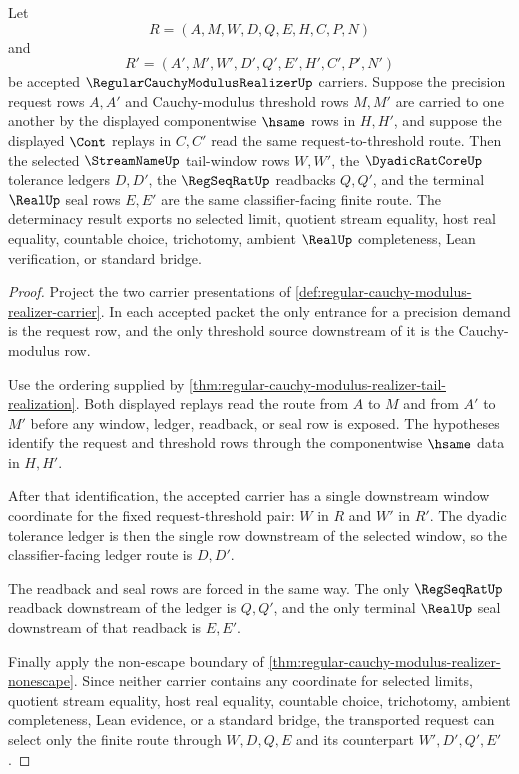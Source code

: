 \begin{theorem}
\label{thm:regular-cauchy-modulus-realizer-request-transport-determinacy}
Let
$$
R=(A,M,W,D,Q,E,H,C,P,N)
$$
and
$$
R'=(A',M',W',D',Q',E',H',C',P',N')
$$
be accepted $\RegularCauchyModulusRealizerUp$ carriers. Suppose the precision request rows $A,A'$ and Cauchy-modulus threshold rows $M,M'$ are carried to one another by the displayed componentwise $\hsame$ rows in $H,H'$, and suppose the displayed $\Cont$ replays in $C,C'$ read the same request-to-threshold route. Then the selected $\StreamNameUp$ tail-window rows $W,W'$, the $\DyadicRatCoreUp$ tolerance ledgers $D,D'$, the $\RegSeqRatUp$ readbacks $Q,Q'$, and the terminal $\RealUp$ seal rows $E,E'$ are the same classifier-facing finite route. The determinacy result exports no selected limit, quotient stream equality, host real equality, countable choice, trichotomy, ambient $\RealUp$ completeness, Lean verification, or standard bridge.
\end{theorem}
\begin{proof}
Project the two carrier presentations of \autoref{def:regular-cauchy-modulus-realizer-carrier}. In each accepted packet the only entrance for a precision demand is the request row, and the only threshold source downstream of it is the Cauchy-modulus row.

Use the ordering supplied by \autoref{thm:regular-cauchy-modulus-realizer-tail-realization}. Both displayed replays read the route from $A$ to $M$ and from $A'$ to $M'$ before any window, ledger, readback, or seal row is exposed. The hypotheses identify the request and threshold rows through the componentwise $\hsame$ data in $H,H'$.

After that identification, the accepted carrier has a single downstream window coordinate for the fixed request-threshold pair: $W$ in $R$ and $W'$ in $R'$. The dyadic tolerance ledger is then the single row downstream of the selected window, so the classifier-facing ledger route is $D,D'$.

The readback and seal rows are forced in the same way. The only $\RegSeqRatUp$ readback downstream of the ledger is $Q,Q'$, and the only terminal $\RealUp$ seal downstream of that readback is $E,E'$.

Finally apply the non-escape boundary of \autoref{thm:regular-cauchy-modulus-realizer-nonescape}. Since neither carrier contains any coordinate for selected limits, quotient stream equality, host real equality, countable choice, trichotomy, ambient completeness, Lean evidence, or a standard bridge, the transported request can select only the finite route through $W,D,Q,E$ and its counterpart $W',D',Q',E'$.
\end{proof}

